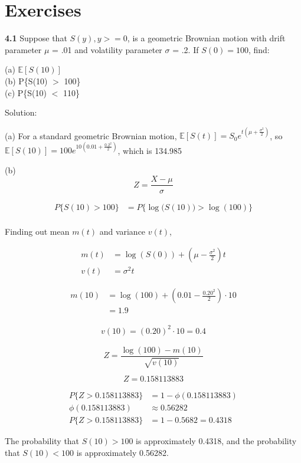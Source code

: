 \documentclass[12pt]{article}
\begin{document}
\section{Exercises}

\textbf{4.1} Suppose that $S(y), y>= 0$, is a geometric Brownian motion with drift parameter $\mu$ = .01 and volatility parameter $\sigma$ = .2. If $S(0) = 100$, find:

\noindent (a) $\mathbb{E}[S(10)]$ \\
(b) P\{S(10) $>$ 100\} \\
(c) P\{S(10) $<$ 110\}

Solution:

(a) For a standard geometric Brownian motion, \(\mathbb{E}[S(t)] = S_0 e^{t(\mu+\frac{\sigma^2}{2})} \), so \(\mathbb{E}[S(10)] = 100 e^{10(0.01+\frac{0.2^2}{2})} \), which is 134.985

(b) \[
Z = \frac{X - \mu}{\sigma}
\] 

\begin{align*}
    P\{S(10) > 100 \} &= P \{ \log \bigl(S(10)\bigr) > \log{(100)} \} \\
\end{align*}

Finding out mean $m(t)$ and variance $v(t)$, 

\begin{align*}
    m(t) &= \log(S(0)) + (\mu - \frac{\sigma^2}{2}) t \\
    v(t) &= \sigma^2 t
\end{align*}

\begin{align*}
    m(10) &= \log(100) + (0.01 - \frac{0.20^2}{2}) \cdot 10 \\
    &= 1.9
\end{align*}

\begin{align*}
    v(10) = (0.20)^2 \cdot 10 = 0.4
\end{align*}

\[
Z = \frac{\log(100) - m(10)}{\sqrt{v(10)}}
\]

\[
Z = 0.158113883
\]

\begin{align*}
P \{Z > 0.158113883 \} &= 1 - \phi{(0.158113883)} \\
\phi(0.158113883) &\approx 0.56282 \\
P \{Z > 0.158113883 \} &= 1 - 0.5682 = 0.4318
\end{align*}

The probability that $S(10) > 100$ is approximately 0.4318, and the probability that $S(10) < 100$ is approximately 0.56282.
\end{document}
